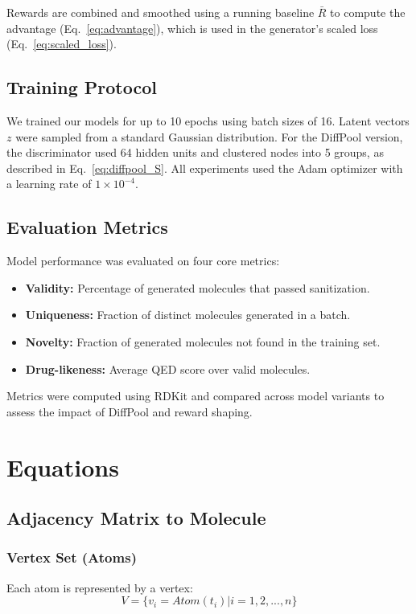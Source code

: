 \documentclass[conference]{IEEEtran}
\begin{document}
Rewards are combined and smoothed using a running baseline $\bar{R}$ to compute the advantage (Eq.~\eqref{eq:advantage}), which is used in the
generator’s scaled loss (Eq.~\eqref{eq:scaled_loss}).

\subsection{Training Protocol}
We trained our models for up to 10 epochs using batch sizes of 16. Latent vectors $z$ were sampled from a standard Gaussian distribution. For
the DiffPool version, the discriminator used 64 hidden units and clustered nodes into 5 groups, as described in Eq.~\eqref{eq:diffpool_S}. All 
experiments used the Adam optimizer with a learning rate of $1 \times 10^{-4}$.

\subsection{Evaluation Metrics}
Model performance was evaluated on four core metrics:

\begin{itemize}
    \item \textbf{Validity:} Percentage of generated molecules that passed sanitization.
    \item \textbf{Uniqueness:} Fraction of distinct molecules generated in a batch.
    \item \textbf{Novelty:} Fraction of generated molecules not found in the training set.
    \item \textbf{Drug-likeness:} Average QED score over valid molecules.
\end{itemize}

Metrics were computed using RDKit and compared across model variants to assess the impact of DiffPool and reward shaping.


\section{Equations}
\subsection{Adjacency Matrix to Molecule}

\subsubsection{Vertex Set (Atoms)} 
\textnormal{Each atom is represented by a vertex:}
\begin{equation} 
    V = \{v_i = Atom(t_i) | i = 1, 2,...,n\}
    \label{eq:vertex}
\end{equation}
\end{document}
